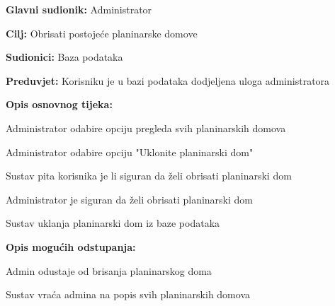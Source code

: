 	
		\noindent {}
		\begin{packed_item}
			
			\item \textbf{Glavni sudionik: }$ $Administrator$ $
			\item  \textbf{Cilj:} $ $Obrisati postojeće planinarske domove $ $
			\item  \textbf{Sudionici:} $ $Baza podataka $ $
			\item  \textbf{Preduvjet:} $ $Korisniku je u bazi podataka dodjeljena uloga administratora$ $
			\item  \textbf{Opis osnovnog tijeka:}
			
			\item[] \begin{packed_enum}
				
				\item $ $Administrator odabire opciju pregleda svih planinarskih domova$ $
				\item $ $Administrator odabire opciju "Uklonite planinarski dom"$ $ 
				\item $ $Sustav pita korisnika je li siguran da želi obrisati planinarski dom$ $
				\item $ $Administrator je siguran da želi obrisati planinarski dom$ $
				\item $ $Sustav uklanja planinarski dom iz baze podataka $ $
				
			\end{packed_enum}
		
				\item  \textbf{Opis mogućih odstupanja:}
			
			\item[] \begin{packed_item}
				
				\item[1.a] $ $Admin odustaje od brisanja planinarskog doma$ $
				\item[] \begin{packed_enum}
					
					\item $ $Sustav vraća admina na popis svih planinarskih domova$ $
					\end{packed_enum}
			\end{packed_item}
		
		\end{packed_item}
	
